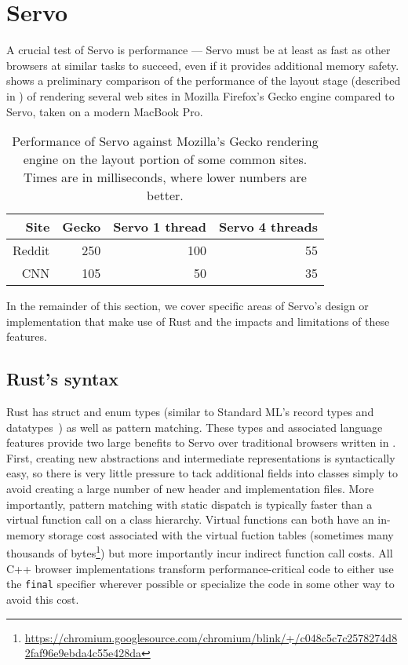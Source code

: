 \section{Servo}
\label{sec:servo}
A crucial test of Servo is performance --- Servo must be at least as fast
as other browsers at similar tasks to succeed, even if it provides additional memory safety.
 shows a preliminary comparison of the performance of the layout stage (described
in ) of rendering several web sites in Mozilla Firefox's Gecko engine compared
to Servo, taken on a modern MacBook Pro.
\begin{table}
  \begin{center}
    \begin{tabular}{r || r | r | r}
      Site & Gecko & Servo 1 thread & Servo 4 threads \\
      \hline
      Reddit & 250 & 100 & 55  \\
      CNN & 105 & 50 & 35 \\
    \end{tabular}%
  \end{center}%
  \caption{Performance of Servo against Mozilla's Gecko rendering engine on the layout portion of some common sites.
  Times are in milliseconds, where lower numbers are better.}
  \label{servo-perf}
\end{table}

In the remainder of this section, we cover specific areas of Servo's design or implementation that make use of
Rust and the impacts and limitations of these features.

\subsection{Rust's syntax}
Rust has struct and enum types (similar to Standard ML's record types and datatypes~\cite{sml97-definition}) as
well as pattern matching.
These types and associated language features provide two large benefits to Servo over traditional browsers
written in \Cplusplus{}.
First, creating new abstractions and intermediate representations is syntactically easy, so there is very little
pressure to tack additional fields into classes simply to avoid creating a large number of new header and implementation
files.
More importantly, pattern matching with static dispatch is typically faster than a virtual function call on a class
hierarchy.
Virtual functions can both have an in-memory storage cost associated with the virtual fuction tables (sometimes many thousands of bytes\footnote{\url{https://chromium.googlesource.com/chromium/blink/+/c048c5c7c2578274d82faf96e9ebda4c55e428da}}) but more importantly
incur indirect function call costs.
All C++ browser implementations transform performance-critical code to either use the \lstinline[language=C]{final}
specifier wherever possible or specialize the code in some other way to avoid this cost.

